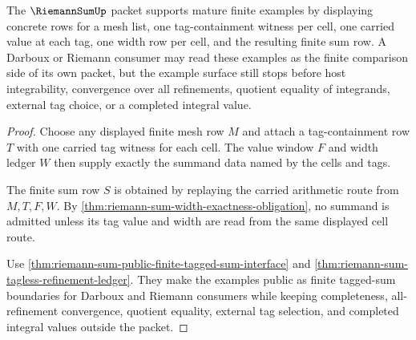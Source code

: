 \begin{theorem}
\label{thm:riemann-sum-mature-finite-mesh-examples}
The $\RiemannSumUp$ packet supports mature finite examples by displaying concrete rows for a mesh list, one tag-containment witness per cell, one carried value at each tag, one width row per cell, and the resulting finite sum row. A Darboux or Riemann consumer may read these examples as the finite comparison side of its own packet, but the example surface still stops before host integrability, convergence over all refinements, quotient equality of integrands, external tag choice, or a completed integral value.
\end{theorem}
\begin{proof}
Choose any displayed finite mesh row $M$ and attach a tag-containment row $T$ with one carried tag witness for each cell. The value window $F$ and width ledger $W$ then supply exactly the summand data named by the cells and tags.

The finite sum row $S$ is obtained by replaying the carried arithmetic route from $M,T,F,W$. By \autoref{thm:riemann-sum-width-exactness-obligation}, no summand is admitted unless its tag value and width are read from the same displayed cell route.

Use \autoref{thm:riemann-sum-public-finite-tagged-sum-interface} and \autoref{thm:riemann-sum-tagless-refinement-ledger}. They make the examples public as finite tagged-sum boundaries for Darboux and Riemann consumers while keeping completeness, all-refinement convergence, quotient equality, external tag selection, and completed integral values outside the packet.
\end{proof}


\begin{closurestatus}{\RiemannSumUp}
  \theoryclosure{\matureClosure}
  \formalstatus{\unformalizedV}
\end{closurestatus}
